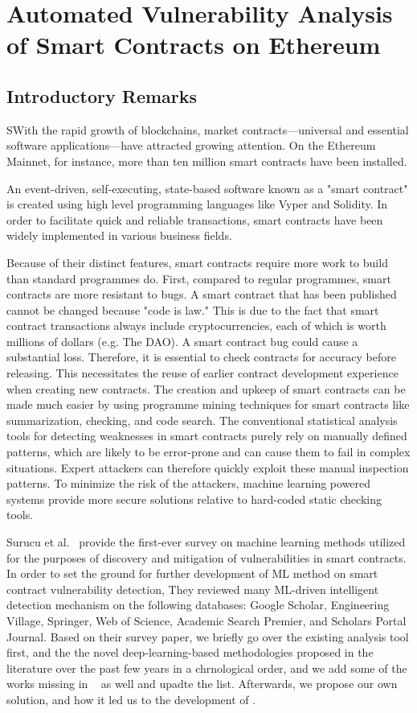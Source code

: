 \chapter{Automated Vulnerability Analysis of Smart Contracts on Ethereum} 
\label{ch:Slither-simil}

\section{Introductory Remarks}
SWith the rapid growth of blockchains, market contracts—universal and essential software applications—have attracted growing attention.
On the Ethereum Mainnet, for instance, more than ten million smart contracts have been installed.

An event-driven, self-executing, state-based software known as a "smart contract" is created using high level programming languages like Vyper and Solidity.
In order to facilitate quick and reliable transactions, smart contracts have been widely implemented in various business fields.

Because of their distinct features, smart contracts require more work to build than standard programmes do.
First, compared to regular programmes, smart contracts are more resistant to bugs.
A smart contract that has been published cannot be changed because "code is law."
This is due to the fact that smart contract transactions always include cryptocurrencies, each of which is worth millions of dollars (e.g. The DAO).
A smart contract bug could cause a substantial loss.
Therefore, it is essential to check contracts for accuracy before releasing.
This necessitates the reuse of earlier contract development experience when creating new contracts.
The creation and upkeep of smart contracts can be made much easier by using programme mining techniques for smart contracts like summarization, checking, and code search.
The conventional statistical analysis tools for detecting weaknesses in smart contracts purely rely on manually defined patterns, which are likely to be error-prone and can cause them to fail in complex situations.
Expert attackers can therefore quickly exploit these manual inspection patterns.
To minimize the risk of the attackers, machine learning powered systems provide more secure solutions relative to hard-coded static checking tools.

Surucu et al.~\cite{surucu2022survey} provide the first-ever survey on machine learning methods utilized for the purposes of discovery and mitigation of vulnerabilities in smart contracts.
In order to set the ground for further development of ML method on smart contract vulnerability detection, They reviewed many ML-driven intelligent detection mechanism on the following databases:
Google Scholar, Engineering Village, Springer, Web of Science, Academic Search Premier, and Scholars Portal Journal.
Based on their survey paper, we briefly go over the existing analysis tool first, and the the novel deep-learning-based methodologies proposed in the literature over the past few years
in a chrnological order, and we add some of the works missing in ~\cite{surucu2022survey} as well and upadte the list.
Afterwards, we propose our own solution, \slithersimil and how it led us to the development of \etherbase.


